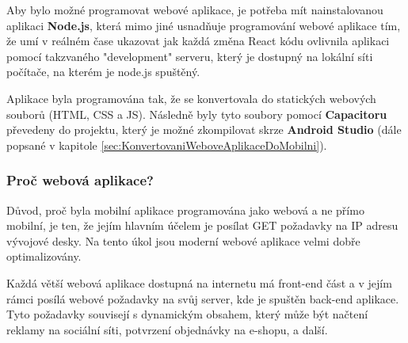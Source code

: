 Aby bylo možné programovat webové aplikace, je potřeba mít nainstalovanou aplikaci \textbf{Node.js}, která mimo jiné usnadňuje programování webové aplikace tím, že umí v reálném čase ukazovat jak každá změna React kódu ovlivnila aplikaci pomocí takzvaného "development" serveru, který je dostupný na lokální síti počítače, na kterém je node.js spuštěný. 

Aplikace byla programována tak, že se konvertovala do statických webových souborů (HTML, CSS a JS). Následně byly tyto soubory pomocí \textbf{Capacitoru} převedeny do projektu, který je možné zkompilovat skrze \textbf{Android Studio} (dále popsané v kapitole \ref{sec:KonvertovaniWeboveAplikaceDoMobilni}).

%
%

\subsubsection{Proč webová aplikace?}\label{sec:ProcWebovaAplikace}
Důvod, proč byla mobilní aplikace programována jako webová a ne přímo mobilní, je ten, že jejím hlavním účelem je posílat GET požadavky na IP adresu vývojové desky. Na tento úkol jsou moderní webové aplikace velmi dobře optimalizovány.

Každá větší webová aplikace dostupná na internetu má front-end část a v jejím rámci posílá webové požadavky na svůj server, kde je spuštěn back-end aplikace. Tyto požadavky souvisejí s dynamickým obsahem, který může být načtení reklamy na sociální síti, potvrzení objednávky na e-shopu, a další.

